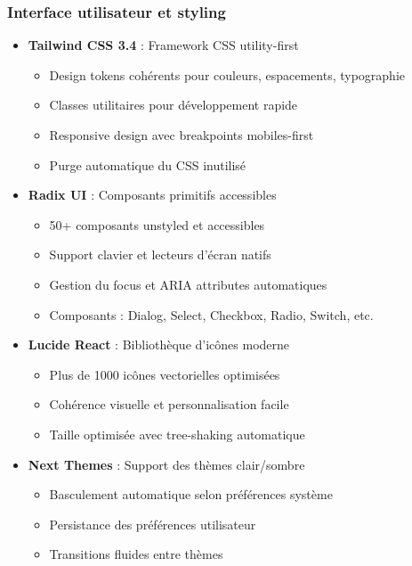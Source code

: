 \documentclass[12pt,a4paper]{report}
\begin{document}
\subsubsection{Interface utilisateur et styling}
\begin{itemize}

\item \textbf{Tailwind CSS 3.4} : Framework CSS utility-first
  \begin{itemize}
  \item Design tokens cohérents pour couleurs, espacements, typographie
  \item Classes utilitaires pour développement rapide
  \item Responsive design avec breakpoints mobiles-first
  \item Purge automatique du CSS inutilisé
  \end{itemize}
\item \textbf{Radix UI} : Composants primitifs accessibles
  \begin{itemize}
  \item 50+ composants unstyled et accessibles
  \item Support clavier et lecteurs d'écran natifs
  \item Gestion du focus et ARIA attributes automatiques
  \item Composants : Dialog, Select, Checkbox, Radio, Switch, etc.
  \end{itemize}
\item \textbf{Lucide React} : Bibliothèque d'icônes moderne
  \begin{itemize}
  \item Plus de 1000 icônes vectorielles optimisées
  \item Cohérence visuelle et personnalisation facile
  \item Taille optimisée avec tree-shaking automatique
  \end{itemize}
\item \textbf{Next Themes} : Support des thèmes clair/sombre

  \begin{itemize}
  \item Basculement automatique selon préférences système
  \item Persistance des préférences utilisateur
  \item Transitions fluides entre thèmes
  \end{itemize}
\end{itemize}
\end{document}
